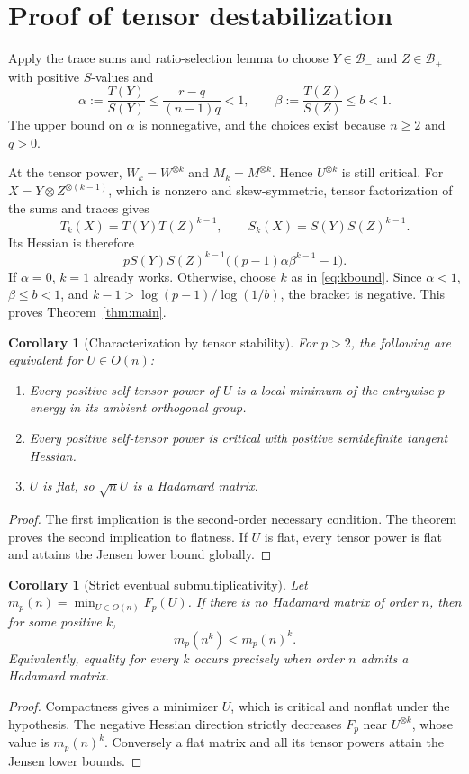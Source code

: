 \documentclass[11pt]{article}
\newtheorem{corollary}[theorem]{Corollary}
\begin{document}
\section{Proof of tensor destabilization}
Apply the trace sums and ratio-selection lemma to choose $Y\in
\mathcal B_-$ and $Z\in\mathcal B_+$ with positive $S$-values and
\[
 \alpha:=\frac{T(Y)}{S(Y)}
 \le\frac{r-q}{(n-1)q}<1,\qquad
 \beta:=\frac{T(Z)}{S(Z)}\le b<1.
\]
The upper bound on $\alpha$ is nonnegative, and the choices exist
because $n\ge2$ and $q>0$.

At the tensor power, $W_k=W^{\otimes k}$ and $M_k=M^{\otimes k}$.
Hence $U^{\otimes k}$ is still critical. For
$X=Y\otimes Z^{\otimes(k-1)}$, which is nonzero and skew-symmetric,
tensor factorization of the sums and traces gives
\[
 T_k(X)=T(Y)T(Z)^{k-1},\qquad
 S_k(X)=S(Y)S(Z)^{k-1}.
\]
Its Hessian is therefore
\begin{equation}\label{eq:tensorhessian}
 pS(Y)S(Z)^{k-1}
 \bigl((p-1)\alpha\beta^{k-1}-1\bigr).
\end{equation}
If $\alpha=0$, $k=1$ already works. Otherwise, choose $k$ as in
\eqref{eq:kbound}. Since $\alpha<1$, $\beta\le b<1$, and
$k-1>\log(p-1)/\log(1/b)$, the bracket is negative. This proves
Theorem~\ref{thm:main}.

\begin{corollary}[Characterization by tensor stability]
For $p>2$, the following are equivalent for $U\in O(n)$:
\begin{enumerate}
\item Every positive self-tensor power of $U$ is a local minimum of
the entrywise $p$-energy in its ambient orthogonal group.
\item Every positive self-tensor power is critical with positive
semidefinite tangent Hessian.
\item $U$ is flat, so $\sqrt nU$ is a Hadamard matrix.
\end{enumerate}
\end{corollary}
\begin{proof}
The first implication is the second-order necessary condition. The
theorem proves the second implication to flatness. If $U$ is flat,
every tensor power is flat and attains the Jensen lower bound globally.
\end{proof}

\begin{corollary}[Strict eventual submultiplicativity]
Let $m_p(n)=\min_{U\in O(n)}F_p(U)$. If there is no Hadamard matrix
of order $n$, then for some positive $k$,
\[
 m_p(n^k)<m_p(n)^k.
\]
Equivalently, equality for every $k$ occurs precisely when order $n$
admits a Hadamard matrix.
\end{corollary}
\begin{proof}
Compactness gives a minimizer $U$, which is critical and nonflat under
the hypothesis. The negative Hessian direction strictly decreases
$F_p$ near $U^{\otimes k}$, whose value is $m_p(n)^k$. Conversely a
flat matrix and all its tensor powers attain the Jensen lower bounds.
\end{proof}
\end{document}
